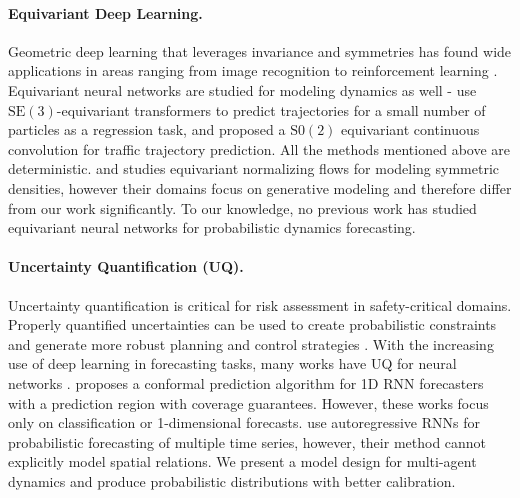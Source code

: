 
\paragraph{Equivariant Deep Learning.}
Geometric deep learning that leverages invariance and symmetries has found wide applications in areas ranging from image recognition \cite{bao2019equivariant, worrall2017harmonic, weiler2019e2cnn} to reinforcement learning \cite{equimdp}. Equivariant neural networks are studied for modeling dynamics as well - \cite{fuchs2020se} use $\mathrm{SE}(3)$-equivariant transformers to predict trajectories for a small number of particles as a regression task, and \cite{ecco} proposed a $\mathrm{S0}(2)$ equivariant continuous convolution for traffic trajectory prediction. All the methods mentioned above are deterministic. \cite{kohler2020equivariant} and \cite{ennormalizingflows} studies equivariant normalizing flows for modeling symmetric densities, however their domains focus on generative modeling and therefore differ from our work significantly. To our knowledge, no previous work has studied equivariant neural networks for probabilistic dynamics forecasting. 

\paragraph{Uncertainty Quantification (UQ).}
Uncertainty quantification is critical for risk assessment in safety-critical domains. Properly quantified uncertainties can be used to create probabilistic constraints and generate more robust planning and control strategies \cite{ostafew2016learning, bujarbaruah2019adaptive}. With the increasing use of deep learning in forecasting tasks, many works have UQ for neural networks \cite{saftyassurance, wu2021quantifying, guo2017calibration}. \cite{2021conformal} proposes a conformal prediction algorithm for 1D RNN forecasters with a prediction region with coverage guarantees. However, these works focus only on classification or 1-dimensional forecasts. \cite{salinas2019high, salinas2020deepar} use autoregressive RNNs for probabilistic forecasting of multiple time series, however, their method cannot explicitly model spatial relations. We present a model design for multi-agent dynamics and produce probabilistic distributions with better calibration.

